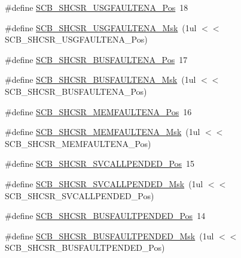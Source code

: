 \begin{DoxyCompactItemize}
\item 
\#define \hyperlink{group___c_m_s_i_s___c_m3___s_c_b_gae71949507636fda388ec11d5c2d30b52}{S\-C\-B\-\_\-\-S\-H\-C\-S\-R\-\_\-\-U\-S\-G\-F\-A\-U\-L\-T\-E\-N\-A\-\_\-\-Pos}~18
\item 
\#define \hyperlink{group___c_m_s_i_s___c_m3___s_c_b_ga056fb6be590857bbc029bed48b21dd79}{S\-C\-B\-\_\-\-S\-H\-C\-S\-R\-\_\-\-U\-S\-G\-F\-A\-U\-L\-T\-E\-N\-A\-\_\-\-Msk}~(1ul $<$$<$ S\-C\-B\-\_\-\-S\-H\-C\-S\-R\-\_\-\-U\-S\-G\-F\-A\-U\-L\-T\-E\-N\-A\-\_\-\-Pos)
\item 
\#define \hyperlink{group___c_m_s_i_s___c_m3___s_c_b_ga3d32edbe4a5c0335f808cfc19ec7e844}{S\-C\-B\-\_\-\-S\-H\-C\-S\-R\-\_\-\-B\-U\-S\-F\-A\-U\-L\-T\-E\-N\-A\-\_\-\-Pos}~17
\item 
\#define \hyperlink{group___c_m_s_i_s___c_m3___s_c_b_ga43e8cbe619c9980e0d1aacc85d9b9e47}{S\-C\-B\-\_\-\-S\-H\-C\-S\-R\-\_\-\-B\-U\-S\-F\-A\-U\-L\-T\-E\-N\-A\-\_\-\-Msk}~(1ul $<$$<$ S\-C\-B\-\_\-\-S\-H\-C\-S\-R\-\_\-\-B\-U\-S\-F\-A\-U\-L\-T\-E\-N\-A\-\_\-\-Pos)
\item 
\#define \hyperlink{group___c_m_s_i_s___c_m3___s_c_b_ga685b4564a8760b4506f14ec4307b7251}{S\-C\-B\-\_\-\-S\-H\-C\-S\-R\-\_\-\-M\-E\-M\-F\-A\-U\-L\-T\-E\-N\-A\-\_\-\-Pos}~16
\item 
\#define \hyperlink{group___c_m_s_i_s___c_m3___s_c_b_gaf084424fa1f69bea36a1c44899d83d17}{S\-C\-B\-\_\-\-S\-H\-C\-S\-R\-\_\-\-M\-E\-M\-F\-A\-U\-L\-T\-E\-N\-A\-\_\-\-Msk}~(1ul $<$$<$ S\-C\-B\-\_\-\-S\-H\-C\-S\-R\-\_\-\-M\-E\-M\-F\-A\-U\-L\-T\-E\-N\-A\-\_\-\-Pos)
\item 
\#define \hyperlink{group___c_m_s_i_s___c_m3___s_c_b_ga2f93ec9b243f94cdd3e94b8f0bf43641}{S\-C\-B\-\_\-\-S\-H\-C\-S\-R\-\_\-\-S\-V\-C\-A\-L\-L\-P\-E\-N\-D\-E\-D\-\_\-\-Pos}~15
\item 
\#define \hyperlink{group___c_m_s_i_s___c_m3___s_c_b_ga6095a7acfbad66f52822b1392be88652}{S\-C\-B\-\_\-\-S\-H\-C\-S\-R\-\_\-\-S\-V\-C\-A\-L\-L\-P\-E\-N\-D\-E\-D\-\_\-\-Msk}~(1ul $<$$<$ S\-C\-B\-\_\-\-S\-H\-C\-S\-R\-\_\-\-S\-V\-C\-A\-L\-L\-P\-E\-N\-D\-E\-D\-\_\-\-Pos)
\item 
\#define \hyperlink{group___c_m_s_i_s___c_m3___s_c_b_gaa22551e24a72b65f1e817f7ab462203b}{S\-C\-B\-\_\-\-S\-H\-C\-S\-R\-\_\-\-B\-U\-S\-F\-A\-U\-L\-T\-P\-E\-N\-D\-E\-D\-\_\-\-Pos}~14
\item 
\#define \hyperlink{group___c_m_s_i_s___c_m3___s_c_b_ga677c23749c4d348f30fb471d1223e783}{S\-C\-B\-\_\-\-S\-H\-C\-S\-R\-\_\-\-B\-U\-S\-F\-A\-U\-L\-T\-P\-E\-N\-D\-E\-D\-\_\-\-Msk}~(1ul $<$$<$ S\-C\-B\-\_\-\-S\-H\-C\-S\-R\-\_\-\-B\-U\-S\-F\-A\-U\-L\-T\-P\-E\-N\-D\-E\-D\-\_\-\-Pos)
$$
\end{DoxyCompactItemize}
